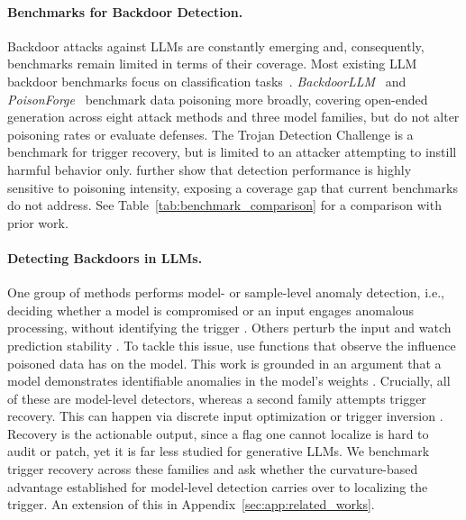 \documentclass[letterpaper]{article} %
\begin{document}
\paragraph{Benchmarks for Backdoor Detection.}
Backdoor attacks against LLMs are constantly emerging and, consequently, benchmarks remain limited in terms of their coverage.
Most existing LLM backdoor benchmarks focus on classification tasks~\citep{liu_elba-bench_2025, sun_peftguard_2025, fu_poisonbench_2025}. \textit{BackdoorLLM}~\citep{li_backdoorllm_2025} and \textit{PoisonForge}~\citep{sun_poisonforge_2026} benchmark data poisoning more broadly, covering open-ended generation across eight attack methods and three model families, but do not alter poisoning rates or evaluate defenses.
The Trojan Detection Challenge \citep{mazeika_harmbench_2024, rando_universal_2024} is a benchmark for trigger recovery, but is limited to an attacker attempting to instill harmful behavior only.
\citet{yan_rethinking_2025} further show that detection performance is highly sensitive to poisoning intensity, exposing a coverage gap that current benchmarks do not address. 
See Table~\ref{tab:benchmark_comparison} for a comparison with prior work.


\paragraph{Detecting Backdoors in LLMs.}
One group of methods performs model- or sample-level anomaly detection, i.e., deciding whether a model is compromised or an input engages anomalous processing, without identifying the trigger \citep{lee_simple_2018, podolskiy_revisiting_2021}.
Others perturb the input and watch prediction stability \citep{gao_strip_2019, guo_scale-up_2023, liu_detecting_2023}.
To tackle this issue, \citet{keenan_mechanistic_2026} use functions that observe the influence poisoned data has on the model.
This work is grounded in an argument that a model demonstrates identifiable anomalies in the model's weights \citep{pham_flatness-aware_2024}.
Crucially, all of these are model-level detectors, whereas a second family attempts trigger recovery.
This can happen via discrete input optimization \citep{zou_universal_2023} or trigger inversion \citep{wang_neural_2019}.
Recovery is the actionable output, since a flag one cannot localize is hard to audit or patch, yet it is far less studied for generative LLMs.
We benchmark trigger recovery across these families and ask whether the curvature-based advantage established for model-level detection carries over to localizing the trigger.
An extension of this in Appendix~\ref{sec:app:related_works}.
\end{document}
